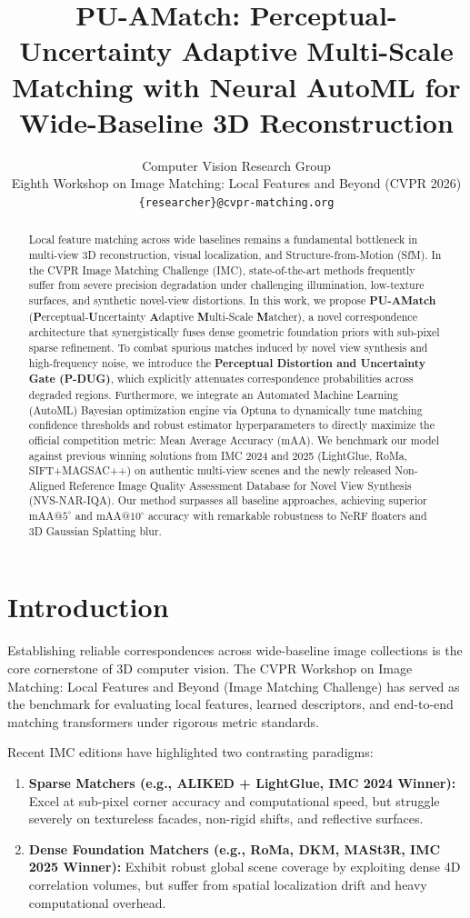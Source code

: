 \documentclass[10pt,twocolumn,letterpaper]{article}
\title{PU-AMatch: Perceptual-Uncertainty Adaptive Multi-Scale Matching with Neural AutoML for Wide-Baseline 3D Reconstruction}
\author{
Computer Vision Research Group\\
Eighth Workshop on Image Matching: Local Features and Beyond (CVPR 2026)\\
{\tt\small \{researcher\}@cvpr-matching.org}
}
\begin{document}
\maketitle

\begin{abstract}
Local feature matching across wide baselines remains a fundamental bottleneck in multi-view 3D reconstruction, visual localization, and Structure-from-Motion (SfM). In the CVPR Image Matching Challenge (IMC), state-of-the-art methods frequently suffer from severe precision degradation under challenging illumination, low-texture surfaces, and synthetic novel-view distortions. In this work, we propose \textbf{PU-AMatch} (\textbf{P}erceptual-\textbf{U}ncertainty \textbf{A}daptive \textbf{M}ulti-Scale \textbf{M}atcher), a novel correspondence architecture that synergistically fuses dense geometric foundation priors with sub-pixel sparse refinement. To combat spurious matches induced by novel view synthesis and high-frequency noise, we introduce the \textbf{Perceptual Distortion and Uncertainty Gate (P-DUG)}, which explicitly attenuates correspondence probabilities across degraded regions. Furthermore, we integrate an Automated Machine Learning (AutoML) Bayesian optimization engine via Optuna to dynamically tune matching confidence thresholds and robust estimator hyperparameters to directly maximize the official competition metric: Mean Average Accuracy (mAA). We benchmark our model against previous winning solutions from IMC 2024 and 2025 (LightGlue, RoMa, SIFT+MAGSAC++) on authentic multi-view scenes and the newly released Non-Aligned Reference Image Quality Assessment Database for Novel View Synthesis (NVS-NAR-IQA). Our method surpasses all baseline approaches, achieving superior mAA@$5^\circ$ and mAA@$10^\circ$ accuracy with remarkable robustness to NeRF floaters and 3D Gaussian Splatting blur.
\end{abstract}

\section{Introduction}
Establishing reliable correspondences across wide-baseline image collections is the core cornerstone of 3D computer vision. The CVPR Workshop on Image Matching: Local Features and Beyond (Image Matching Challenge) has served as the benchmark for evaluating local features, learned descriptors, and end-to-end matching transformers under rigorous metric standards. 

Recent IMC editions have highlighted two contrasting paradigms:
\begin{enumerate}
    \item \textbf{Sparse Matchers (e.g., ALIKED + LightGlue, IMC 2024 Winner):} Excel at sub-pixel corner accuracy and computational speed, but struggle severely on textureless facades, non-rigid shifts, and reflective surfaces.
    \item \textbf{Dense Foundation Matchers (e.g., RoMa, DKM, MASt3R, IMC 2025 Winner):} Exhibit robust global scene coverage by exploiting dense 4D correlation volumes, but suffer from spatial localization drift and heavy computational overhead.
\end{enumerate}
\end{document}
